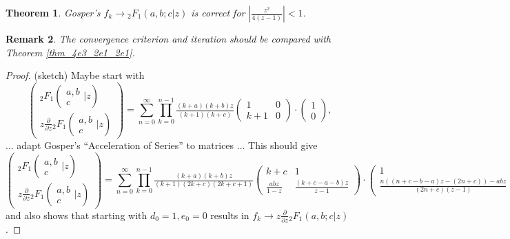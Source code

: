 \documentclass[12pt]{article}
\numberwithin{equation}{section}
\newtheorem{theorem}{Theorem}[section]
\newtheorem{remark}[theorem]{Remark}
\newcommand{\Head}[3] {{}_{#1}{#2}_{#3}}
\newcommand{\ArgS}[3] {( \begin{smallmatrix} #1 \\ #2 \end{smallmatrix} | {#3})}
\begin{document}
\begin{theorem}
Gosper's $f_k \to \Head{2}{F}{1}(a,b;c|z)$ is correct for $|\frac{z^2}{4(z-1)}|<1$.
\end{theorem}
\begin{remark}
The convergence criterion and iteration should be compared with Theorem \ref{thm_4e3_2e1_2e1}.
\end{remark}
\begin{proof}(sketch)
Maybe start with
\begin{equation*}
\begin{pmatrix}
\Head{2}{F}{1} \ArgS{a,b}{c}{z} \\ z \frac{\partial}{\partial z} \Head{2}{F}{1}\ArgS{a,b}{c}{z}
\end{pmatrix}
 = \sum_{n=0}^{\infty}
\prod_{k=0}^{n-1}
\tfrac{(k+a)(k+b)z}{(k+1)(k+c)}
\begin{pmatrix}
1 & 0 \\
k+1 & 0
\end{pmatrix}
\cdot \begin{pmatrix}
1 \\
0
\end{pmatrix}\text{,}
\end{equation*}
...
adapt Gosper's ``Acceleration of Series'' to matrices
...
This should give
\begin{equation*}
\begin{pmatrix}
\Head{2}{F}{1} \ArgS{a,b}{c}{z} \\ z \frac{\partial}{\partial z} \Head{2}{F}{1}\ArgS{a,b}{c}{z}
\end{pmatrix}
 = \sum_{n=0}^{\infty}
\prod_{k=0}^{n-1}
\tfrac{(k+a)(k+b)z}{(k+1)(2k+c)(2k+c+1)}
\begin{pmatrix}
k+c & 1 \\
\frac{a b z}{1-z} & \frac{(k+c-a-b)z}{z-1}
\end{pmatrix}
\cdot \begin{pmatrix}
1 \\
\tfrac{n((n+c-b-a)z-(2n+c))-a b z}{(2n+c)(z-1)}
\end{pmatrix}\text{,}
\end{equation*}
and also shows that starting with $d_0=1, e_0=0$ results in $f_k \to z \frac{\partial}{\partial z} \Head{2}{F}{1}(a,b;c|z)$.
\end{proof}
\end{document}
